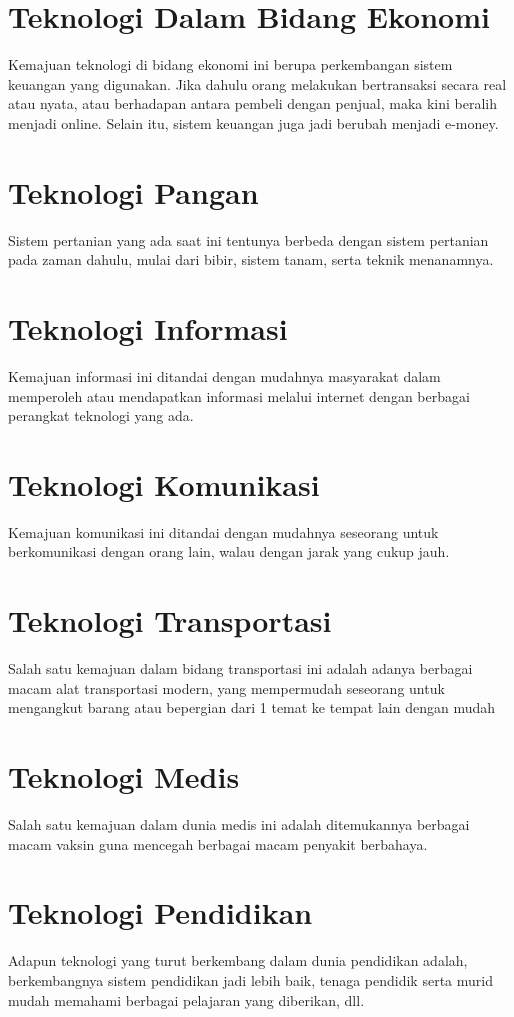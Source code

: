 \section{Teknologi Dalam Bidang Ekonomi}
Kemajuan teknologi di bidang ekonomi ini berupa perkembangan sistem keuangan yang digunakan. Jika dahulu orang melakukan bertransaksi secara real atau nyata, atau berhadapan antara pembeli dengan penjual, maka kini beralih menjadi online. Selain itu, sistem keuangan juga jadi berubah menjadi e-money.
\section{Teknologi Pangan}
Sistem pertanian yang ada saat ini tentunya berbeda dengan sistem pertanian pada zaman dahulu, mulai dari bibir, sistem tanam, serta teknik menanamnya.
\section{Teknologi Informasi}
Kemajuan informasi ini ditandai dengan mudahnya masyarakat dalam memperoleh atau mendapatkan informasi melalui internet dengan berbagai perangkat teknologi yang ada.
\section{Teknologi Komunikasi}
Kemajuan komunikasi ini ditandai dengan mudahnya seseorang untuk berkomunikasi dengan orang lain, walau dengan jarak yang cukup jauh.
\section{Teknologi Transportasi}
Salah satu kemajuan dalam bidang transportasi ini adalah adanya berbagai macam alat transportasi modern, yang mempermudah seseorang untuk mengangkut barang atau bepergian dari 1 temat ke tempat lain dengan mudah
\section{Teknologi Medis}
Salah satu kemajuan dalam dunia medis ini adalah ditemukannya berbagai macam vaksin guna mencegah berbagai macam penyakit berbahaya.
\section{Teknologi Pendidikan}
Adapun teknologi yang turut berkembang dalam dunia pendidikan adalah, berkembangnya sistem pendidikan jadi lebih baik, tenaga pendidik serta murid mudah memahami berbagai pelajaran yang diberikan, dll.






